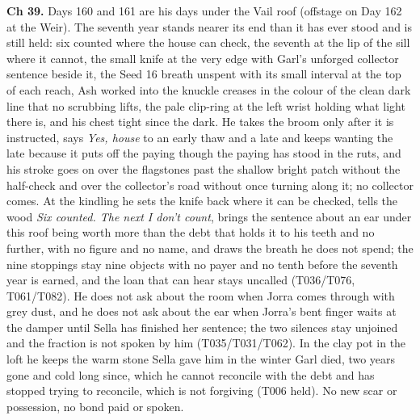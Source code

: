 \documentclass{design/chronicle}
\begin{document}
{\textbf{Ch 39.} Days 160 and 161 are his days under the Vail roof (offstage on Day 162 at the Weir). The seventh year stands nearer its end than it has ever stood and is still held: six counted where the house can check, the seventh at the lip of the sill where it cannot, the small knife at the very edge with Garl’s unforged collector sentence beside it, the Seed 16 breath unspent with its small interval at the top of each reach, Ash worked into the knuckle creases in the colour of the clean dark line that no scrubbing lifts, the pale clip-ring at the left wrist holding what light there is, and his chest tight since the dark. He takes the broom only after it is instructed, says \emph{Yes, house} to an early thaw and a late and keeps wanting the late because it puts off the paying though the paying has stood in the ruts, and his stroke goes on over the flagstones past the shallow bright patch without the half-check and over the collector’s road without once turning along it; no collector comes. At the kindling he sets the knife back where it can be checked, tells the wood \emph{Six counted. The next I don’t count}, brings the sentence about an ear under this roof being worth more than the debt that holds it to his teeth and no further, with no figure and no name, and draws the breath he does not spend; the nine stoppings stay nine objects with no payer and no tenth before the seventh year is earned, and the loan that can hear stays uncalled (T036/T076, T061/T082). He does not ask about the room when Jorra comes through with grey dust, and he does not ask about the ear when Jorra’s bent finger waits at the damper until Sella has finished her sentence; the two silences stay unjoined and the fraction is not spoken by him (T035/T031/T062). In the clay pot in the loft he keeps the warm stone Sella gave him in the winter Garl died, two years gone and cold long since, which he cannot reconcile with the debt and has stopped trying to reconcile, which is not forgiving (T006 held). No new scar or possession, no bond paid or spoken.

}
\end{document}
